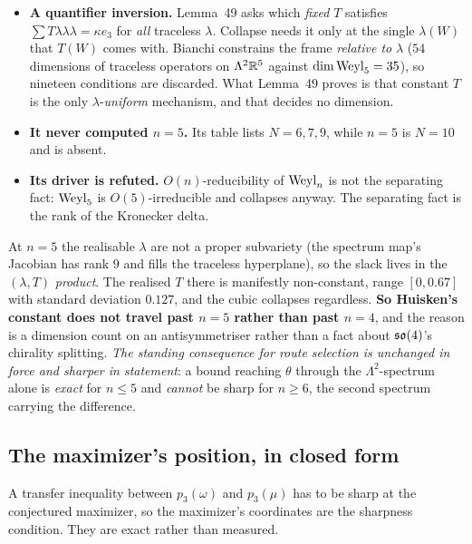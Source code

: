 \begin{itemize}[leftmargin=1.5em,nosep]
\item \textbf{A quantifier inversion.} Lemma~49 asks which \emph{fixed} $T$ satisfies $\sum T\lambda\lambda\lambda=\kappa e_3$ for \emph{all} traceless $\lambda$. Collapse needs it only at the single $\lambda(W)$ that $T(W)$ comes with. Bianchi constrains the frame \emph{relative to} $\lambda$ ($54$ dimensions of traceless operators on $\Lambda^2\mathbb{R}^5$ against $\dim\mathrm{Weyl}_5=35$), so nineteen conditions are discarded. What Lemma~49 proves is that constant $T$ is the only $\lambda$-\emph{uniform} mechanism, and that decides no dimension.
\item \textbf{It never computed $n=5$.} Its table lists $N=6,7,9$, while $n=5$ is $N=10$ and is absent.
\item \textbf{Its driver is refuted.} $O(n)$-reducibility of $\mathrm{Weyl}_n$ is not the separating fact: $\mathrm{Weyl}_5$ is $O(5)$-irreducible and collapses anyway. The separating fact is the rank of the Kronecker delta.
\end{itemize}

At $n=5$ the realisable $\lambda$ are not a proper subvariety (the spectrum map's Jacobian has rank $9$ and fills the traceless hyperplane), so the slack lives in the $(\lambda,T)$ \emph{product}. The realised $T$ there is manifestly non-constant, range $[0,0.67]$ with standard deviation $0.127$, and the cubic collapses regardless. \textbf{So Huisken's constant does not travel past $n=5$ rather than past $n=4$}, and the reason is a dimension count on an antisymmetriser rather than a fact about $\mathfrak{so}(4)$'s chirality splitting. \emph{The standing consequence for route selection is unchanged in force and sharper in statement}: a bound reaching $\theta$ through the $\Lambda^2$-spectrum alone is \emph{exact} for $n\le5$ and \emph{cannot} be sharp for $n\ge6$, the second spectrum carrying the difference.

\subsection{The maximizer's position, in closed form}\label{sec:maximiserpos}

A transfer inequality between $p_3(\omega)$ and $p_3(\mu)$ has to be sharp at the conjectured maximizer, so the maximizer's coordinates are the sharpness condition. They are exact rather than measured.

